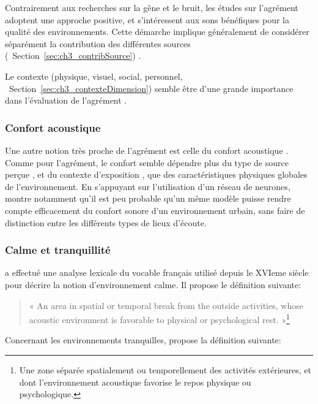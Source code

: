 Contrairement aux recherches sur la gêne et le bruit, les études sur l'agrément adoptent une approche positive, et s'intéressent aux sons bénéfiques pour la qualité des environnements. Cette démarche implique généralement de considérer séparément la contribution des différentes sources (\cf~Section~\ref{sec:ch3_contribSource})  \citep{lavandier2006contribution,garcia2012validation}.

Le contexte (physique, visuel, social, personnel, \cf~Section~\ref{sec:ch3_contexteDimension}) semble être d'une grande importance dans l'évaluation de l'agrément \citep{guillen2007importance}.


\subsubsection{Confort acoustique}
\label{sec:ch3_confort}

Une autre notion très proche de l'agrément est celle du confort acoustique \citep{jeon2011non,tse2012perception,jeon2013soundwalk}. Comme pour l'agrément, le confort semble dépendre plus du type de source perçue \citep{yang2005acoustic}, et du contexte d'exposition \citep{meng2013field}, que des caractéristiques physiques globales de l'environnement. En s'appuyant sur l'utilisation d'un réseau de neurones, \citep{yu2009modeling} montre notamment qu'il est peu probable qu'un même modèle puisse rendre compte efficacement du confort sonore d'un environnement urbain, sans faire de distinction entre les différents types de lieux d'écoute.

\subsubsection{Calme et tranquillité}

\citep{delaitre2012definition} a effectué une analyse lexicale du vocable français utilisé depuis le XVIeme siècle pour décrire la notion d'environnement calme. Il propose le définition suivante:

\begin{quote}
« An area in spatial or temporal break from the outside activities, whose acoustic environment is favorable to physical or psychological rest. »\footnote{Une zone séparée spatialement ou temporellement des activités extérieures, et dont l'environnement acoustique favorise le repos physique ou psychologique.}
\end{quote}

Concernant les environnements tranquilles, \citep{pheasant2008acoustic} propose la définition suivante:

